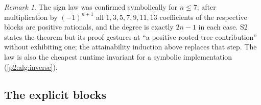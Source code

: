 \documentclass[11pt,a4paper,oneside]{book}
\theoremstyle{plain}
\theoremstyle{definition}
\theoremstyle{remark}
\newtheorem{remark}[theorem]{Remark}
\begin{document}
\begin{remark}
The sign law was confirmed symbolically for \(n\le7\): after multiplication by
\((-1)^{n+1}\) all \(1,3,5,7,9,11,13\) coefficients of the respective blocks
are positive rationals, and the degree is exactly \(2n-1\) in each case.
\textsf{S2} states the theorem but its proof gestures at ``a positive
rooted-tree contribution'' without exhibiting one; the attainability induction
above replaces that step.  The law is also the cheapest runtime invariant for a
symbolic implementation (\cref{p2:alg:inverse}).
\end{remark}

\subsection{The explicit blocks}
\end{document}
